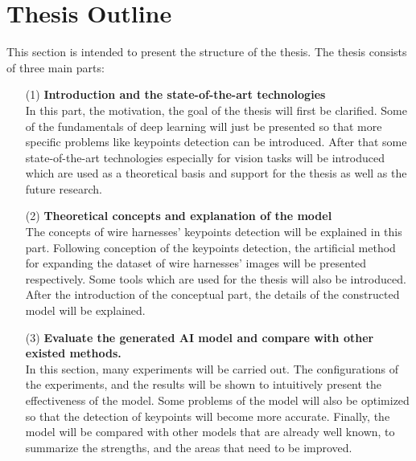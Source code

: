 \section{Thesis Outline}
This section is intended to present the structure of the thesis. The thesis consists of three main parts:
\begin{itemize}
    \item [(1)] \textbf{Introduction and the state-of-the-art technologies}\\ 
    In this part, the motivation, the goal of the thesis will first be clarified. 
    Some of the fundamentals of deep learning will just be presented so that more specific problems like keypoints detection can be introduced.
    After that some state-of-the-art technologies especially for vision tasks will be introduced which are used as a theoretical basis and support for the thesis 
    as well as the future research.
    \item [(2)] \textbf{Theoretical concepts and explanation of the model}\\ 
    The concepts of wire harnesses' keypoints detection will be explained in this part. Following conception of the keypoints detection, the artificial method 
    for expanding the dataset of wire harnesses' images will be presented respectively. Some tools which are used for the thesis will also be introduced.
    After the introduction of the conceptual part, the details of the constructed model will be explained.
    \item [(3)] \textbf{Evaluate the generated AI model and compare with other existed methods.} \\ 
    In this section, many experiments will be carried out. The configurations of the experiments, and the results will be shown to intuitively present the 
    effectiveness of the model. Some problems of the model will also be optimized so that the detection of keypoints will become more accurate. 
    Finally, the model will be compared with other models that are already well known, to summarize the strengths, and the areas that need to be improved.
  \end{itemize}